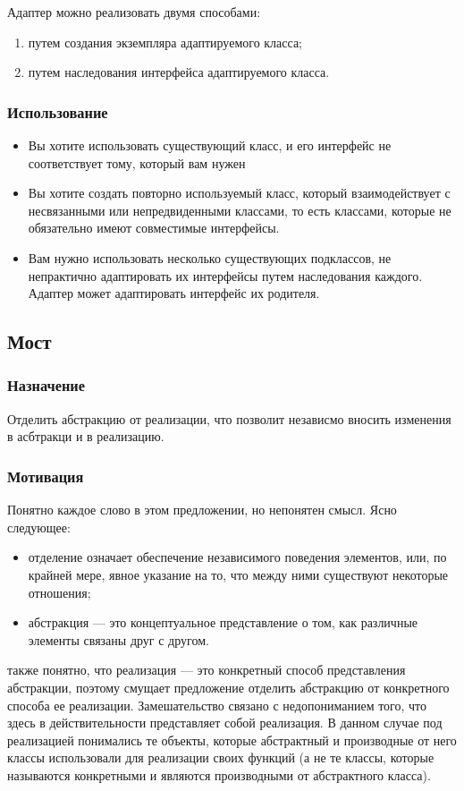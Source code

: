 \documentclass[10pt]{article}
\begin{document}
Адаптер можно реализовать двумя способами:
\begin{enumerate}
	\item путем создания экземпляра адаптируемого класса;
	\item путем наследования интерфейса адаптируемого класса.
\end{enumerate}

\subsubsection{Использование}
\begin{itemize}
	\item Вы хотите использовать существующий класс, и его интерфейс не соответствует тому, 
		который вам нужен
	\item Вы хотите создать повторно используемый класс, который взаимодействует с
		несвязанными или непредвиденными классами, то есть классами, которые не обязательно
		имеют совместимые интерфейсы. 
	\item Вам нужно использовать несколько существующих подклассов, не непрактично адаптировать их
		интерфейсы путем наследования каждого. Адаптер может адаптировать интерфейс их родителя.
\end{itemize}

\subsection{Мост}
\subsubsection{Назначение}
Отделить абстракцию от реализации, что позволит независмо вносить изменения
в асбтракци и в реализацию.

\subsubsection{Мотивация}
Понятно каждое слово в этом предложении, но непонятен смысл.
Ясно следующее:
\begin{itemize}
\item отделение означает обеспечение независимого поведения элементов, или, по
крайней мере, явное указание на то, что между ними существуют некоторые
отношения;
\item абстракция --- это концептуальное представление о том, как различные элементы связаны друг с другом.
\end{itemize}
также понятно, что реализация --- это конкретный способ представления абстракции,
поэтому смущает предложение отделить абстракцию от конкретного способа ее реализации.
Замешательство связано с недопониманием того, что здесь
в действительности представляет собой реализация. В данном случае под реализацией
понимались те объекты, которые абстрактный и производные от него классы использовали
для реализации своих функций (а не те классы, которые называются конкретными и
являются производными от абстрактного класса).
\end{document}
